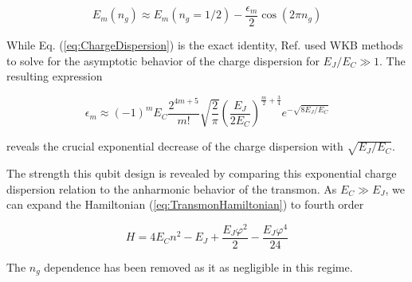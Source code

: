 \documentclass[12 pt]{book}
\begin{document}
\begin{equation}
E_m(n_g)\approx E_m(n_g=1/2)-\frac{\epsilon_m}{2}\cos(2\pi n_g)
\end{equation}

While Eq. (\ref{eq:ChargeDispersion}) is the exact identity, Ref. \cite{Koch} used WKB methods to solve for the asymptotic behavior of the charge dispersion for $E_J/E_C\gg 1$. The resulting expression

\begin{equation}
\epsilon_m\approx(-1)^m E_C \frac{2^{4m+5}}{m!}\sqrt{\frac{2}{\pi}}\left(\frac{E_J}{2E_C} \right)^{\frac{m}{2}+\frac{3}{4}}e^{-\sqrt{8E_J/E_C}}
\end{equation}

reveals the crucial exponential decrease of the charge dispersion with $\sqrt{E_J/E_C}$.

The strength this qubit design is revealed by comparing this exponential charge dispersion relation to the anharmonic behavior of the transmon. As $E_C\gg E_J$, we can expand the Hamiltonian (\ref{eq:TransmonHamiltonian}) to fourth order

\begin{equation}
H=4E_Cn^2-E_J +\frac{E_J\varphi^2}{2}-\frac{E_J\varphi^4}{24}
\end{equation}
 
The $n_g$ dependence has been removed as it as negligible in this regime. 
\end{document}
